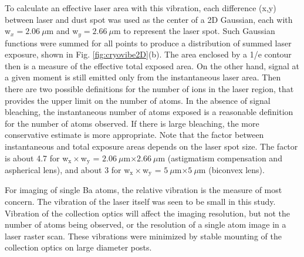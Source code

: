 To calculate an effective laser area with this vibration, each difference (x,y) between laser and dust spot was used as the center of a 2D Gaussian, each with w$_{x} = 2.06~\mu$m and w$_{y} = 2.66~\mu$m to represent the laser spot.  Such Gaussian functions were summed for all points to produce a distribution of summed laser exposure, shown in Fig. \ref{fig:cryovibe2D}(b).  The area enclosed by a 1/e contour then is a measure of the effective total exposed area.  On the other hand, signal at a given moment is still emitted only from the instantaneous laser area.  Then there are two possible definitions for the number of ions in the laser region, that provides the upper limit on the number of atoms.  In the absence of signal bleaching, the instantaneous number of atoms exposed is a reasonable definition for the number of atoms observed.  If there is large bleaching, the more conservative estimate is more appropriate.  Note that the factor between instantaneous and total exposure areas depends on the laser spot size.  The factor is about 4.7 for w$_{\text{x}} \times $w$_{\text{y}}$ = $2.06~\mu$m$ \times 2.66~\mu$m (astigmatism compensation and aspherical lens), and about 3 for w$_{\text{x}} \times $w$_{\text{y}}$ = $5~\mu$m$ \times 5~\mu$m (biconvex lens).




For imaging of single Ba atoms, the relative vibration is the measure of most concern.  The vibration of the laser itself was seen to be small in this study.  Vibration of the collection optics will affect the imaging resolution, but not the number of atoms being observed, or the resolution of a single atom image in a laser raster scan.  These vibrations were minimized by stable mounting of the collection optics on large diameter posts.

